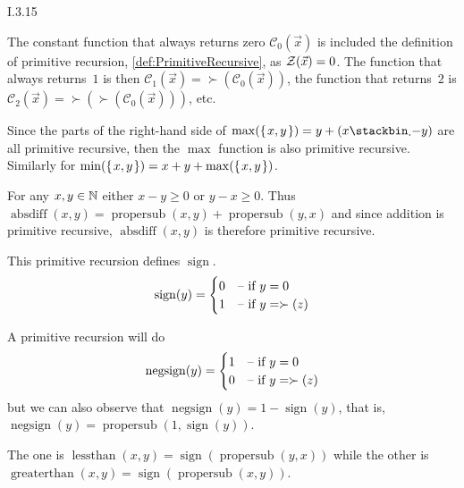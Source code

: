 %
%
\begin{ans}{I.3.15}
\begin{exparts}
\item The constant function that always returns zero
$\mathcal{C}_0(\vec{x})$
is included the definition of primitive
recursion, \cref{def:PrimitiveRecursive}, as $\operatorname{\mathcal{Z}}(\vec{x})=0$.
The function that always returns~$1$ is then
$\mathcal{C}_1(\vec{x})=\succ(\mathcal{C}_0(\vec{x}))$,
the function that returns~$2$ is
$\mathcal{C}_2(\vec{x})=\succ(\succ(\mathcal{C}_0(\vec{x})))$, etc.

\item Since the parts of the right-hand side of
  $\max(\set{x,y})=y+(x\propersub y)$ are all primitive recursive,
  then the $\max$ function is also primitive recursive.
  Similarly for $\min(\set{x,y})=x+y\propersum\max(\set{x,y})$.

\item For any $x,y\in\mathbb{N}$ either $x-y\geq 0$ or $y-x\geq 0$.
Thus
$\operatorname{absdiff}(x,y)=\operatorname{propersub}(x,y)+\operatorname{propersub}(y,x)$ and since addition is primitive recursive,
$\operatorname{absdiff}(x,y)$ is therefore primitive recursive.

\item This primitive recursion defines $\operatorname{sign}$.
\begin{equation*}
  \operatorname{sign}(y)=
    \begin{cases}
      0   &\text{-- \text{if $y=0$}}  \\
      1   &\text{-- \text{if $y=\succ(z)$}}
    \end{cases}
\end{equation*}

\item A primitive recursion will do
\begin{equation*}
  \operatorname{negsign}(y)=
    \begin{cases}
      1   &\text{-- \text{if $y=0$}}  \\
      0   &\text{-- \text{if $y=\succ(z)$}}
    \end{cases}
\end{equation*}
but we can also observe that
$\operatorname{negsign}(y)=1-\operatorname{sign}(y)$, that is,
$\operatorname{negsign}(y)=\operatorname{propersub}(1,\operatorname{sign}(y))$.

\item The one is
$\operatorname{lessthan}(x,y)=\operatorname{sign}(\operatorname{propersub}(y,x))$
while the other is
$\operatorname{greaterthan}(x,y)=\operatorname{sign}(\operatorname{propersub}(x,y))$.
\end{exparts}
\end{ans}
